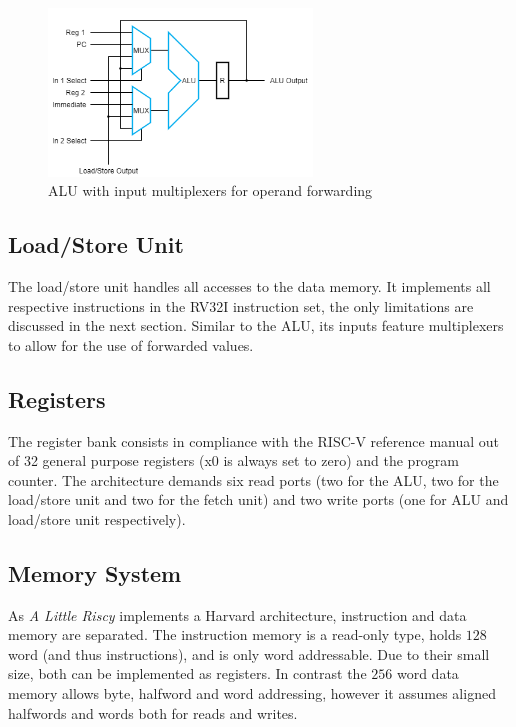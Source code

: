 \documentclass[conference]{IEEEtran}
\begin{document}
\begin{figure}
	\centering
	\includegraphics[width=7cm]{alu_mux.png}
	\caption{ALU with input multiplexers for operand forwarding}
	\label{fig:alu}
\end{figure}

\subsection{Load/Store Unit} \label{sec:load_store}
The load/store unit handles all accesses to the data memory. It implements all respective instructions in the RV32I instruction set, the only limitations are discussed in the next section. Similar to the ALU, its inputs feature multiplexers to allow for the use of forwarded values.

\subsection{Registers} \label{sec:registers}
The register bank consists in compliance with the RISC-V reference manual out of 32 general purpose registers (x0 is always set to zero) and the program counter. The architecture demands six read ports (two for the ALU, two for the load/store unit and two for the fetch unit) and two write ports (one for ALU and load/store unit respectively).

\subsection{Memory System} \label{sec:memory}
As \emph{A Little Riscy} implements a Harvard architecture, instruction and data memory are separated. The instruction memory is a read-only type, holds $128$ word (and thus instructions), and is only word addressable. Due to their small size, both can be implemented as registers. In contrast the $256$ word data memory allows byte, halfword and word addressing, however it assumes aligned halfwords and words both for reads and writes.
\end{document}
